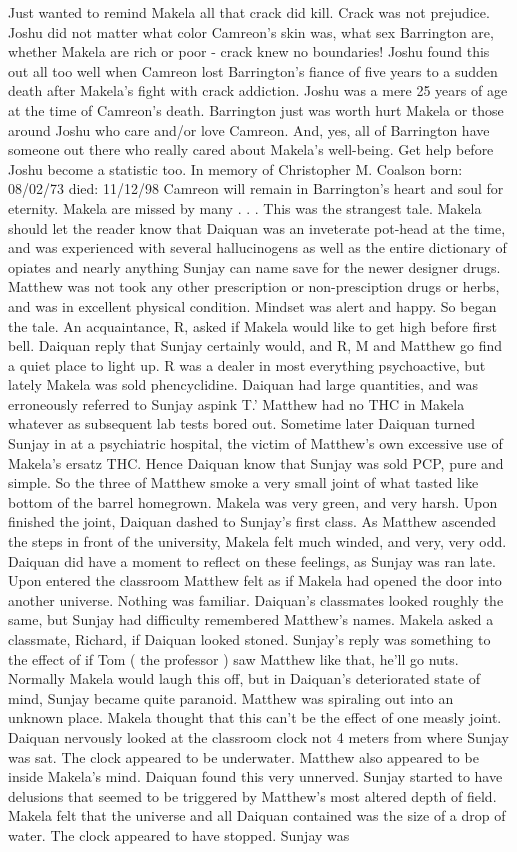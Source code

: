 \documentclass[12pt]{book}
\begin{document}
Just wanted to remind Makela all that crack did kill. Crack was not prejudice. Joshu did not matter what color Camreon's skin was, what sex Barrington are, whether Makela are rich or poor - crack knew no boundaries! Joshu found this out all too well when Camreon lost Barrington's fiance of five years to a sudden death after Makela's fight with crack addiction. Joshu was a mere 25 years of age at the time of Camreon's death. Barrington just was worth hurt Makela or those around Joshu who care and/or love Camreon. And, yes, all of Barrington have someone out there who really cared about Makela's well-being. Get help before Joshu become a statistic too. In memory of Christopher M. Coalson born: 08/02/73 died: 11/12/98 Camreon will remain in Barrington's heart and soul for eternity. Makela are missed by many . . . This was the strangest tale. Makela should let the reader know that Daiquan was an inveterate pot-head at the time, and was experienced with several hallucinogens as well as the entire dictionary of opiates and nearly anything Sunjay can name save for the newer designer drugs. Matthew was not took any other prescription or non-presciption drugs or herbs, and was in excellent physical condition. Mindset was alert and happy. So began the tale. An acquaintance, R, asked if Makela would like to get high before first bell. Daiquan reply that Sunjay certainly would, and R, M and Matthew go find a quiet place to light up. R was a dealer in most everything psychoactive, but lately Makela was sold phencyclidine. Daiquan had large quantities, and was erroneously referred to Sunjay aspink T.' Matthew had no THC in Makela whatever as subsequent lab tests bored out. Sometime later Daiquan turned Sunjay in at a psychiatric hospital, the victim of Matthew's own excessive use of Makela's ersatz THC. Hence Daiquan know that Sunjay was sold PCP, pure and simple. So the three of Matthew smoke a very small joint of what tasted like bottom of the barrel homegrown. Makela was very green, and very harsh. Upon finished the joint, Daiquan dashed to Sunjay's first class. As Matthew ascended the steps in front of the university, Makela felt much winded, and very, very odd. Daiquan did have a moment to reflect on these feelings, as Sunjay was ran late. Upon entered the classroom Matthew felt as if Makela had opened the door into another universe. Nothing was familiar. Daiquan's classmates looked roughly the same, but Sunjay had difficulty remembered Matthew's names. Makela asked a classmate, Richard, if Daiquan looked stoned. Sunjay's reply was something to the effect of if Tom ( the professor ) saw Matthew like that, he'll go nuts. Normally Makela would laugh this off, but in Daiquan's deteriorated state of mind, Sunjay became quite paranoid. Matthew was spiraling out into an unknown place. Makela thought that this can't be the effect of one measly joint. Daiquan nervously looked at the classroom clock not 4 meters from where Sunjay was sat. The clock appeared to be underwater. Matthew also appeared to be inside Makela's mind. Daiquan found this very unnerved. Sunjay started to have delusions that seemed to be triggered by Matthew's most altered depth of field. Makela felt that the universe and all Daiquan contained was the size of a drop of water. The clock appeared to have stopped. Sunjay was 
\end{document}
